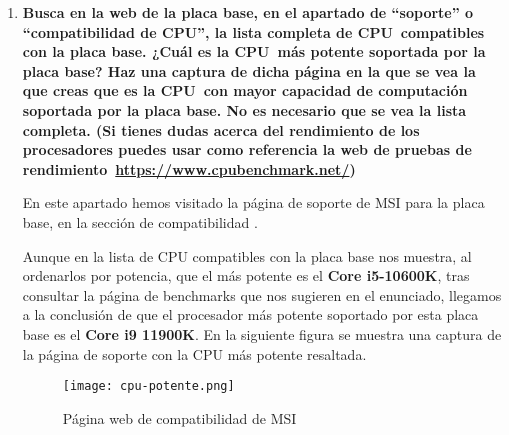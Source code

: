 \begin{enumerate}
     \item \textbf{Busca en la web de la placa base, en el apartado de ``soporte'' o ``compatibilidad de CPU'', la lista completa de CPU compatibles con la placa base. ¿Cuál es la CPU más potente soportada por la placa base? Haz una captura de dicha página en la que se vea la que creas que es la CPU con mayor capacidad de computación soportada por la placa base. No es necesario que se vea la lista completa. (Si tienes dudas acerca del rendimiento de los procesadores puedes usar como referencia la web de pruebas de rendimiento \url{https://www.cpubenchmark.net/})}

     En este apartado hemos visitado la página de soporte de MSI para la placa base, en la sección de compatibilidad \cite{msi04}.

     Aunque en la lista de CPU compatibles con la placa base nos muestra, al ordenarlos por potencia, que el más potente es el \textbf{Core i5-10600K}, tras consultar la página de benchmarks que nos sugieren en el enunciado, llegamos a la conclusión de que el procesador más potente soportado por esta placa base es el \textbf{Core i9 11900K}. En la siguiente figura se muestra una captura de la página de soporte con la CPU más potente resaltada.

     \begin{figure}[ht]
         \centering
         \texttt{[image: cpu-potente.png]}
         \caption{Página web de compatibilidad de MSI}
     \end{figure}
\end{enumerate}


\newpage



